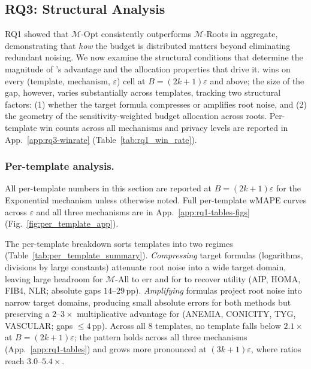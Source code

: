 \subsection{RQ3: Structural Analysis}
\label{sec:experiments-rq3}



RQ1 showed that $\mathcal{M}$-Opt consistently outperforms $\mathcal{M}$-Roots in aggregate, demonstrating that \emph{how} the budget is distributed matters beyond eliminating redundant noising. We now examine the structural conditions that determine the magnitude of \sysname{}'s advantage and the allocation properties that drive it. \sysname{} wins on every (template, mechanism, $\varepsilon$) cell at $B = (2k{+}1)\varepsilon$ and above; the size of the gap, however, varies substantially across templates, tracking two structural factors: (1) whether the target formula compresses or amplifies root noise, and (2) the geometry of the sensitivity-weighted budget allocation across roots. Per-template win counts across all mechanisms and privacy levels are reported in App.~\ref{app:rq3-winrate} (Table~\ref{tab:rq1_win_rate}).

\subsubsection{Per-template analysis.}
\label{sec:per-template}

All per-template numbers in this section are reported at $B = (2k{+}1)\varepsilon$ for the Exponential mechanism unless otherwise noted. Full per-template wMAPE curves across $\varepsilon$ and all three mechanisms are in App.~\ref{app:rq1-tables-figs} (Fig.~\ref{fig:per_template_app}).

The per-template breakdown sorts templates into two regimes (Table~\ref{tab:per_template_summary}). \emph{Compressing} target formulas (logarithms, divisions by large constants) attenuate root noise into a wide target domain, leaving large headroom for $\mathcal{M}$-All to err and for \sysname{} to recover utility (AIP, HOMA, FIB4, NLR; absolute gaps $14$--$29$\,pp). \emph{Amplifying} formulas project root noise into narrow target domains, producing small absolute errors for both methods but preserving a $2$--$3\times$ multiplicative advantage for \sysname{} (ANEMIA, CONICITY, TYG, VASCULAR; gaps $\leq 4$\,pp). Across all 8 templates, no template falls below $2.1\times$ at $B = (2k{+}1)\varepsilon$; the pattern holds across all three mechanisms (App.~\ref{app:rq1-tables}) and grows more pronounced at $(3k{+}1)\varepsilon$, where ratios reach $3.0$--$5.4\times$.


